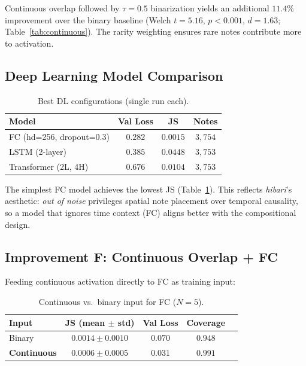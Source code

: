 \documentclass[conference,10pt,a4paper]{IEEEtran}
\begin{document}
Continuous overlap followed by $\tau = 0.5$ binarization yields an
additional $11.4\%$ improvement over the binary baseline (Welch
$t = 5.16$, $p < 0.001$, $d = 1.63$; Table~\ref{tab:continuous}).
The rarity weighting ensures rare notes contribute more to activation.

\subsection{Deep Learning Model Comparison}
\label{subsec:dl}

\begin{table}[t]
\centering
\caption{Best DL configurations (single run each).}
\label{tab:dl}
\begin{tabular}{lccc}
\toprule
Model & Val Loss & JS & Notes \\
\midrule
FC (hd=256, dropout=0.3)   & $0.282$ & $\mathbf{0.0015}$ & $3{,}754$ \\
LSTM (2-layer)         & $0.385$ & $0.0448$ & $3{,}753$ \\
Transformer (2L, 4H)   & $0.676$ & $0.0104$ & $3{,}753$ \\
\bottomrule
\end{tabular}
\end{table}

The simplest FC model achieves the lowest JS (Table~\ref{tab:dl}).
This reflects \emph{hibari}'s aesthetic: \emph{out of noise} privileges
spatial note placement over temporal causality, so a model that ignores
time context (FC) aligns better with the compositional design.

\subsection{Improvement F: Continuous Overlap + FC}
\label{subsec:improvF}

Feeding continuous activation directly to FC as training input:

\begin{table}[t]
\centering
\caption{Continuous vs.\ binary input for FC ($N=5$).}
\label{tab:improvF}
\begin{tabular}{lcccc}
\toprule
Input & JS (mean $\pm$ std) & Val Loss & Coverage \\
\midrule
Binary   & $0.0014 \pm 0.0010$ & $0.070$ & $0.948$ \\
\textbf{Continuous} & $\mathbf{0.0006 \pm 0.0005}$ & $\mathbf{0.031}$ & $\mathbf{0.991}$ \\
\bottomrule
\end{tabular}
\end{table}
\end{document}
